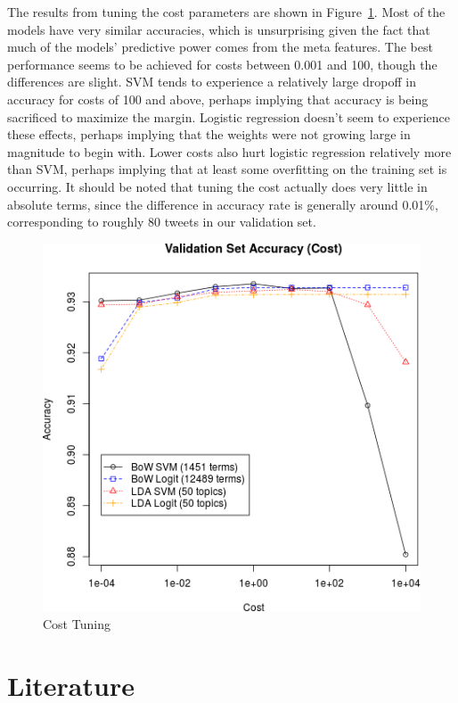 \documentclass{sig-alternate-05-2015}
\begin{document}
The results from tuning the cost parameters are shown in Figure~\ref{fig:cost}. Most of the models have very similar accuracies, which is unsurprising given the fact that much of the models' predictive power comes from the meta features. The best performance seems to be achieved for costs between 0.001 and 100, though the differences are slight. SVM tends to experience a relatively large dropoff in accuracy for costs of 100 and above, perhaps implying that accuracy is being sacrificed to maximize the margin. Logistic regression doesn't seem to experience these effects, perhaps implying that the weights were not growing large in magnitude to begin with. Lower costs also hurt logistic regression relatively more than SVM, perhaps implying that at least some overfitting on the training set is occurring. It should be noted that tuning the cost actually does very little in absolute terms, since the difference in accuracy rate is generally around 0.01\%, corresponding to roughly 80 tweets in our validation set.

\begin{figure}
  \centering
  \includegraphics[scale=0.5]{valid_cost.png}
  \caption{Cost Tuning}
  \label{fig:cost}
\end{figure}

\section{Literature}
\end{document}
